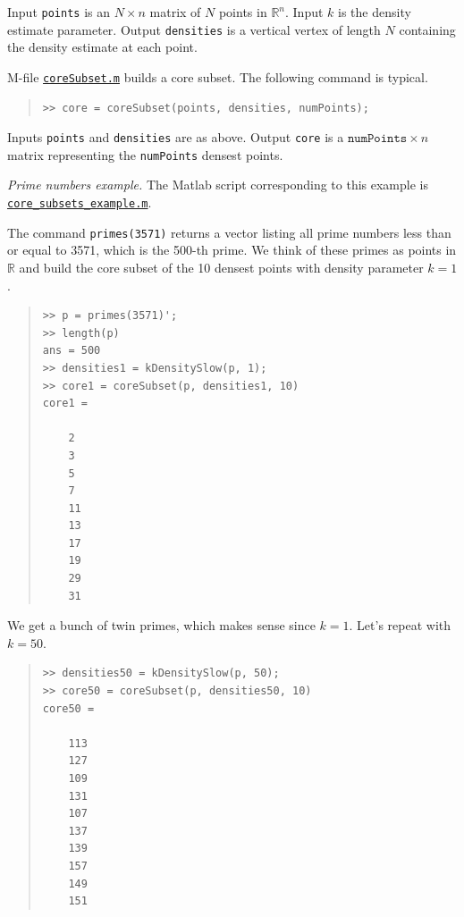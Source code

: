 \documentclass[amscd, amssymb, verbatim]{amsart}[12pt]
\theoremstyle{remark}
\theoremstyle{remark}
\theoremstyle{remark}
\newcommand{\R}{\mathbb{R}}
\begin{document}
Input \texttt{points} is an $N\times n$ matrix of $N$ points in $\R^n$. Input $k$ is the density estimate parameter. Output \texttt{densities} is a vertical vertex of length $N$ containing the density estimate at each point. 

M-file \href{https://github.com/appliedtopology/javaplex/tree/master/src/matlab/for_distribution/tutorial_examples/coreSubset.m}{\texttt{coreSubset.m}} builds a core subset. The following command is typical.

\begin{quote} \begin{verbatim}
>> core = coreSubset(points, densities, numPoints); 
\end{verbatim} \end{quote}

Inputs \texttt{points} and \texttt{densities} are as above. Output \texttt{core} is a $\texttt{numPoints}\times n$ matrix representing the \texttt{numPoints} densest points. 

{\em Prime numbers example.} The Matlab script corresponding to this example is \href{https://github.com/appliedtopology/javaplex/tree/master/src/matlab/for_distribution/tutorial_examples/core_subsets_example.m}{\texttt{core\_subsets\_example.m}}.

The command \texttt{primes(3571)} returns a vector listing all prime numbers less than or equal to 3571, which is the 500-th prime. We think of these primes as points in $\R$ and build the core subset of the 10 densest points with density parameter $k = 1$.
\begin{quote} \begin{verbatim} 
>> p = primes(3571)';
>> length(p)
ans = 500
>> densities1 = kDensitySlow(p, 1);
>> core1 = coreSubset(p, densities1, 10)
core1 =

    2
    3
    5
    7
    11
    13
    17
    19
    29
    31
\end{verbatim} \end{quote}

We get a bunch of twin primes, which makes sense since $k = 1$. Let's repeat with $k = 50$.

\begin{quote} \begin{verbatim}
>> densities50 = kDensitySlow(p, 50);
>> core50 = coreSubset(p, densities50, 10)
core50 =

    113
    127
    109
    131
    107
    137
    139
    157
    149
    151
\end{verbatim} \end{quote}
 
\end{document}
